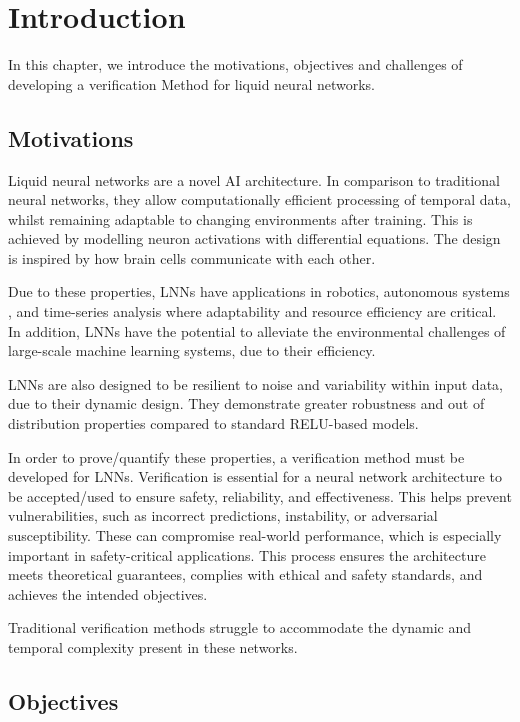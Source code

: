 \chapter{Introduction}

In this chapter, we introduce the motivations, objectives and challenges of developing a verification Method for liquid neural networks.

\section{Motivations}

Liquid neural networks are a novel AI architecture. In comparison to traditional neural networks, they allow computationally efficient processing of temporal data, whilst remaining adaptable to changing environments after training. This is achieved by modelling neuron activations with differential equations. The design is inspired by how brain cells communicate with each other.

Due to these properties, LNNs have applications in robotics, autonomous systems \cite{chahineRobustFlightNavigation2023}, and time-series analysis where adaptability and resource efficiency are critical. In addition, LNNs have the potential to alleviate the environmental challenges of large-scale machine learning systems, due to their efficiency.

LNNs are also designed to be resilient to noise and variability within input data, due to their dynamic design. They demonstrate greater robustness and out of distribution properties compared to standard RELU-based models.

In order to prove/quantify these properties, a verification method must be developed for LNNs. Verification is essential for a neural network architecture to be accepted/used to ensure safety, reliability, and effectiveness. This helps prevent vulnerabilities, such as incorrect predictions, instability, or adversarial susceptibility. These can compromise real-world performance, which is especially important in safety-critical applications. This process ensures the architecture meets theoretical guarantees, complies with ethical and safety standards, and achieves the intended objectives.

Traditional verification methods struggle to accommodate the dynamic and temporal complexity present in these networks.

\section{Objectives}

